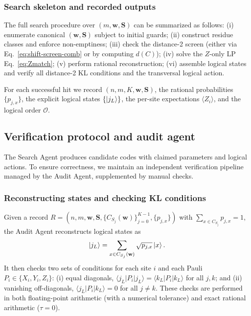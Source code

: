 \documentclass[pdflatex,sn-nature]{sn-jnl}%
\theoremstyle{thmstyleone}%
\theoremstyle{thmstyletwo}%
\theoremstyle{thmstylethree}%
\begin{document}
\subsubsection{Search skeleton and recorded outputs}

The full search procedure over $(m,\mathbf w,\mathbf S)$ can be summarized as follows:
(i) enumerate canonical $(\mathbf w,\mathbf S)$ subject to initial guards;
(ii) construct residue classes and enforce non-emptiness;
(iii) check the distance-2 screen (either via Eq.~\eqref{eq:shift-screen-comb} or by computing $d(C)$);
(iv) solve the $Z$-only LP Eq.~\eqref{eq:Zmatch};
(v) perform rational reconstruction;
(vi) assemble logical states and verify all distance-2 KL conditions and the transversal logical action.

For each successful hit we record $(n,m,K,\mathbf w,\mathbf S)$, the rational probabilities $\{p_{j,x}\}$, the explicit logical states $\{\ket{j_L}\}$, the per-site expectations $\langle Z_i\rangle$, and the logical order $\mathcal O$.

\subsection{Verification protocol and audit agent}
\label{subsec:audit}

The Search Agent produces candidate codes with claimed parameters and logical actions. To ensure correctness, we maintain an independent verification pipeline managed by the Audit Agent, supplemented by manual checks.

\subsubsection{Reconstructing states and checking KL conditions}

Given a record
$R=(n,m,\mathbf w,\mathbf S,\{C_{S_j}(\mathbf w)\}_{j=0}^{K-1},\{p_{j,x}\})$
with $\sum_{x\in C_{S_j}}p_{j,x}=1$, the Audit Agent reconstructs logical states as
\[
  \ket{j_{L}}=\sum_{x\in C_{S_j}(\mathbf{w})}\sqrt{p_{j,x}} \ket{x}.
\]
It then checks two sets of conditions for each site $i$ and each Pauli $P_i\in\{X_i,Y_i,Z_i\}$:
(i) equal diagonals,
$\langle j_{L}|P_i| j_{L} \rangle=\langle k_{L} |P_i| k_{L} \rangle$ for all $j,k$;
and (ii) vanishing off-diagonals,
$\langle j_{L} | P_i | k_{L} \rangle=0$ for all $j \neq k$.
These checks are performed in both floating-point arithmetic (with a numerical tolerance) and exact rational arithmetic ($\tau=0$).
\end{document}
